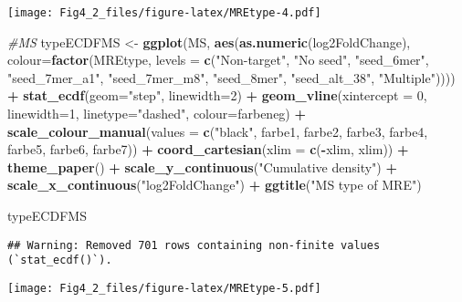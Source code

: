 \documentclass[
]{article}
\newenvironment{Shaded}{\begin{snugshade}}{\end{snugshade}}
\newcommand{\AttributeTok}[1]{\textcolor[rgb]{0.13,0.29,0.53}{#1}}
\newcommand{\CommentTok}[1]{\textcolor[rgb]{0.56,0.35,0.01}{\textit{#1}}}
\newcommand{\DecValTok}[1]{\textcolor[rgb]{0.00,0.00,0.81}{#1}}
\newcommand{\FunctionTok}[1]{\textcolor[rgb]{0.13,0.29,0.53}{\textbf{#1}}}
\newcommand{\NormalTok}[1]{#1}
\newcommand{\OtherTok}[1]{\textcolor[rgb]{0.56,0.35,0.01}{#1}}
\newcommand{\SpecialCharTok}[1]{\textcolor[rgb]{0.81,0.36,0.00}{\textbf{#1}}}
\newcommand{\StringTok}[1]{\textcolor[rgb]{0.31,0.60,0.02}{#1}}
\begin{document}
\texttt{[image: Fig4\_2\_files/figure-latex/MREtype-4.pdf]}

\begin{Shaded}
\begin{Highlighting}[]
\CommentTok{\#MS}
\NormalTok{typeECDFMS }\OtherTok{\textless{}{-}} \FunctionTok{ggplot}\NormalTok{(MS, }\FunctionTok{aes}\NormalTok{(}\FunctionTok{as.numeric}\NormalTok{(log2FoldChange), }
                              \AttributeTok{colour=}\FunctionTok{factor}\NormalTok{(MREtype, }\AttributeTok{levels =} \FunctionTok{c}\NormalTok{(}\StringTok{"Non{-}target"}\NormalTok{, }\StringTok{"No seed"}\NormalTok{, }\StringTok{"seed\_6mer"}\NormalTok{, }\StringTok{"seed\_7mer\_a1"}\NormalTok{, }\StringTok{"seed\_7mer\_m8"}\NormalTok{, }\StringTok{"seed\_8mer"}\NormalTok{, }\StringTok{"seed\_alt\_38"}\NormalTok{, }\StringTok{"Multiple"}\NormalTok{)))) }\SpecialCharTok{+} 
  \FunctionTok{stat\_ecdf}\NormalTok{(}\AttributeTok{geom=}\StringTok{"step"}\NormalTok{, }\AttributeTok{linewidth=}\DecValTok{2}\NormalTok{) }\SpecialCharTok{+}
  \FunctionTok{geom\_vline}\NormalTok{(}\AttributeTok{xintercept =} \DecValTok{0}\NormalTok{, }\AttributeTok{linewidth=}\DecValTok{1}\NormalTok{, }\AttributeTok{linetype=}\StringTok{"dashed"}\NormalTok{, }\AttributeTok{colour=}\NormalTok{farbeneg) }\SpecialCharTok{+}
  \FunctionTok{scale\_colour\_manual}\NormalTok{(}\AttributeTok{values =} \FunctionTok{c}\NormalTok{(}\StringTok{"black"}\NormalTok{, farbe1, farbe2, farbe3, farbe4, farbe5, farbe6, farbe7)) }\SpecialCharTok{+}
  \FunctionTok{coord\_cartesian}\NormalTok{(}\AttributeTok{xlim =} \FunctionTok{c}\NormalTok{(}\SpecialCharTok{{-}}\NormalTok{xlim, xlim)) }\SpecialCharTok{+} 
  \FunctionTok{theme\_paper}\NormalTok{() }\SpecialCharTok{+}
  \FunctionTok{scale\_y\_continuous}\NormalTok{(}\StringTok{"Cumulative density"}\NormalTok{) }\SpecialCharTok{+} \FunctionTok{scale\_x\_continuous}\NormalTok{(}\StringTok{"log2FoldChange"}\NormalTok{) }\SpecialCharTok{+}
  \FunctionTok{ggtitle}\NormalTok{(}\StringTok{"MS type of MRE"}\NormalTok{)}

\NormalTok{typeECDFMS}
\end{Highlighting}
\end{Shaded}

\begin{verbatim}
## Warning: Removed 701 rows containing non-finite values (`stat_ecdf()`).
\end{verbatim}

\texttt{[image: Fig4\_2\_files/figure-latex/MREtype-5.pdf]}
\end{document}
